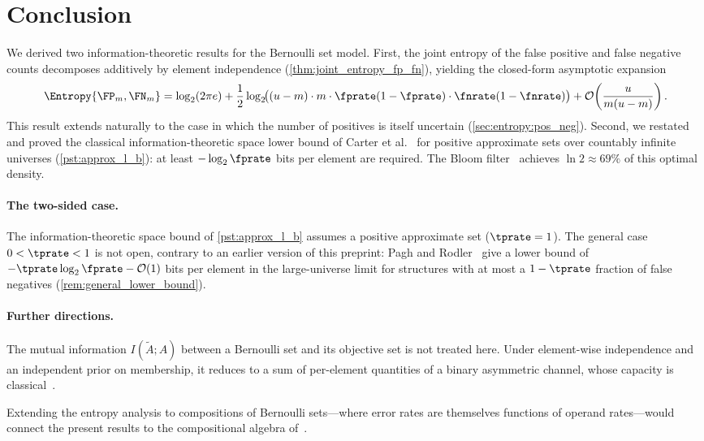 \section{Conclusion}
\label{sec:conclusion_ent}

We derived two information-theoretic results for the Bernoulli set model.
First, the joint entropy of the false positive and false negative counts
decomposes additively by element independence
(\cref{thm:joint_entropy_fp_fn}), yielding the closed-form asymptotic
expansion
\begin{equation}
    \Entropy{\FP_m, \FN_m}
    = \log_2(2\pi e)
    + \frac{1}{2}\log_2\!\bigl(
        (u-m) \cdot m \cdot \fprate(1-\fprate) \cdot \fnrate(1-\fnrate)
      \bigr)
    + \mathcal{O}\!\left(\frac{u}{m(u-m)}\right).
\end{equation}
This result extends naturally to the case in which the number of positives is
itself uncertain (\cref{sec:entropy:pos_neg}).
Second, we restated and proved the classical information-theoretic space lower
bound of Carter et al.~\cite{carterExact} for positive approximate sets over
countably infinite universes (\cref{pst:approx_l_b}): at least
$-\log_2 \fprate$ bits per element are required.
The Bloom filter~\cite{bf} achieves $\ln 2 \approx 69\%$ of this optimal
density.

\paragraph{The two-sided case.}
The information-theoretic space bound of \cref{pst:approx_l_b} assumes a
positive approximate set ($\tprate = 1$).
The general case $0 < \tprate < 1$ is not open, contrary to an earlier version
of this preprint: Pagh and Rodler~\cite{paghRodlerLossy} give a lower bound of
$-\tprate \log_2 \fprate - \mathcal{O}(1)$ bits per element in the
large-universe limit for structures with at most a $1 - \tprate$ fraction of
false negatives (\cref{rem:general_lower_bound}).

\paragraph{Further directions.}
The mutual information $I(\tilde{A}; A)$ between a Bernoulli set and its
objective set is not treated here.
Under element-wise independence and an independent prior on membership,
it reduces to a sum of per-element quantities of a
binary asymmetric channel, whose capacity is classical~\cite{silvermanBinary}.

Extending the entropy analysis to compositions of Bernoulli sets---where error
rates are themselves functions of operand rates---would connect the present
results to the compositional algebra of~\cite{bernoulliComposition}.

